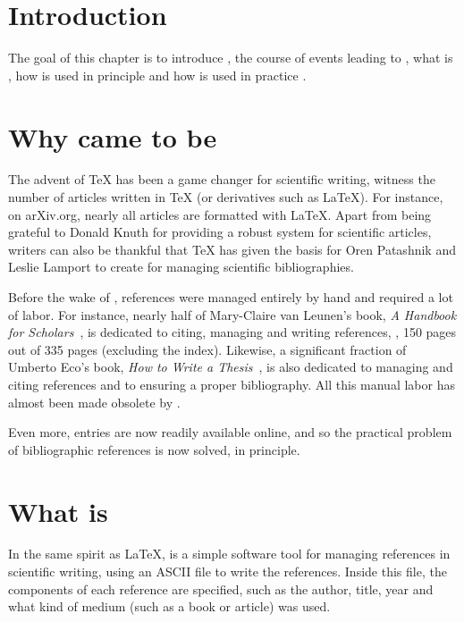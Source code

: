\section{Introduction}
The goal of this chapter is to introduce {\bibtex}, the course of
events leading to {\bibtex} , what
{\bibtex} is , how {\bibtex} is used
in principle  and how {\bibtex} is
used in practice .


\section{Why {\bibtex} came to be}
\label{sec:why_bibtex_came_to_be}

The advent of {\TeX} has been a game changer for scientific writing,
witness the number of articles written in {\TeX} (or derivatives such
as {\LaTeX}).  For instance, on arXiv.org, nearly all articles are
formatted with \LaTeX.  Apart from being grateful to Donald Knuth
for providing a robust system for scientific articles, writers can
also be thankful that {\TeX} has given the basis for Oren Patashnik
and Leslie Lamport to create {\bibtex} for managing scientific
bibliographies.

Before the wake of {\bibtex}, references were managed entirely by hand
and required a lot of labor.  For instance, nearly half of Mary-Claire
van Leunen's book, \textit{A Handbook for
  Scholars}~\cite{leunen1992_handbook}, is dedicated to citing,
managing and writing references, \ie, 150 pages out of 335 pages
(excluding the index).  Likewise, a significant fraction of Umberto
Eco's book, \textit{How to Write a Thesis}~\cite{eco1985_thesis}, is
also dedicated to managing and citing references and to ensuring a
proper bibliography.  All this manual labor has almost been made
obsolete by {\bibtex}.

Even more, {\bibtex} entries are now readily available online, and so
the practical problem of bibliographic references is now solved, in
principle.

\section{What is {\bibtex}}
\label{sec:principles_of_bibtex}

In the same spirit as {\LaTeX}, {\bibtex} is a simple software tool
for managing references in scientific writing, using an ASCII file to
write the references.  Inside this file, the components of each
reference are specified, such as the author, title, year and what kind
of medium (such as a book or article) was used.

